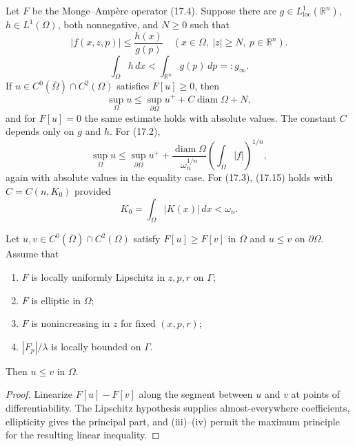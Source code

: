 \begin{theorem}\label{gt-ch17-thm-17-4}
Let $F$ be the Monge--Amp\`ere operator (17.4).  Suppose there are
$g\in L^1_{\mathrm{loc}}(\mathbb R^n)$, $h\in L^1(\Omega)$, both
nonnegative, and $N\ge0$ such that
\begin{equation}
|f(x,z,p)|\le \frac{h(x)}{g(p)}
\quad (x\in\Omega,\ |z|\ge N,\ p\in\mathbb R^n).
\tag{17.13}
\end{equation}
\begin{equation}
\int_\Omega h\,dx<\int_{\mathbb R^n}g(p)\,dp=:g_\infty.
\tag{17.14}
\end{equation}
If $u\in C^0(\overline\Omega)\cap C^2(\Omega)$ satisfies $F[u]\ge0$, then
\begin{equation}\tag{17.15}
\sup_\Omega u\le\sup_{\partial\Omega}u^+
+C\operatorname{diam}\Omega+N,
\end{equation}
and for $F[u]=0$ the same estimate holds with absolute values.  The constant
$C$ depends only on $g$ and $h$.  For (17.2),
\begin{equation}\tag{17.16}
\sup_\Omega u\le\sup_{\partial\Omega}u^+
+\frac{\operatorname{diam}\Omega}{\omega_n^{1/n}}
\left(\int_\Omega|f|\right)^{1/n},
\end{equation}
again with absolute values in the equality case.  For (17.3), (17.15) holds
with $C=C(n,K_0)$ provided
\begin{equation}\tag{17.17}
K_0=\int_\Omega|K(x)|\,dx<\omega_n.
\end{equation}
\end{theorem}

\begin{theorem}\label{gt-ch17-thm-17-5}
Let $u,v\in C^0(\overline\Omega)\cap C^2(\Omega)$ satisfy
$F[u]\ge F[v]$ in $\Omega$ and $u\le v$ on $\partial\Omega$.  Assume that
\begin{enumerate}
\item[(i)] $F$ is locally uniformly Lipschitz in $z,p,r$ on $\Gamma$;
\item[(ii)] $F$ is elliptic in $\Omega$;
\item[(iii)] $F$ is nonincreasing in $z$ for fixed $(x,p,r)$;
\item[(iv)] $|F_p|/\lambda$ is locally bounded on $\Gamma$.
\end{enumerate}
Then $u\le v$ in $\Omega$.
\end{theorem}
\begin{proof}
\sketch Linearize $F[u]-F[v]$ along the segment between $u$ and $v$ at
points of differentiability.  The Lipschitz hypothesis supplies almost-everywhere
coefficients, ellipticity gives the principal part, and (iii)--(iv) permit the
maximum principle for the resulting linear inequality.
\end{proof}

